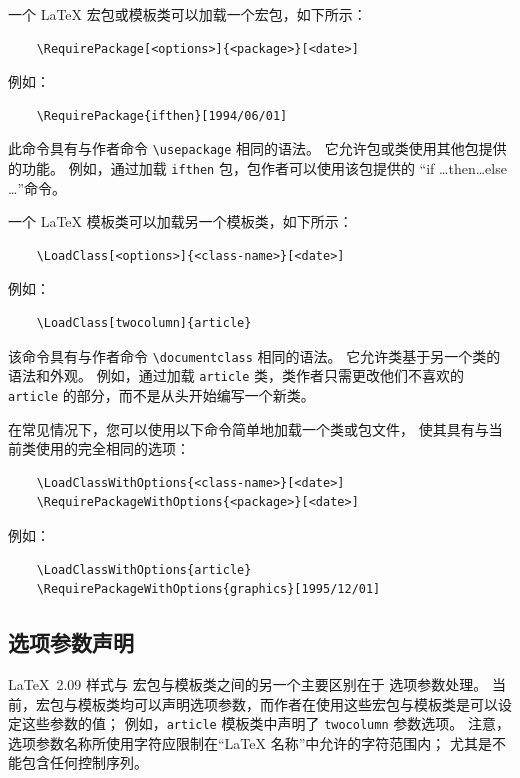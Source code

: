 \documentclass{ltxguide}[1995/11/28]
\begin{document}
一个 \LaTeX{} 宏包或模板类可以加载一个宏包，如下所示：
\begin{verbatim}
	\RequirePackage[<options>]{<package>}[<date>]
\end{verbatim}
例如：
\begin{verbatim}
	\RequirePackage{ifthen}[1994/06/01]
\end{verbatim}
此命令具有与作者命令 \verb|\usepackage| 相同的语法。
它允许包或类使用其他包提供的功能。
例如，通过加载 \verb|ifthen| 包，包作者可以使用该包提供的
“if \dots then\dots else \dots”命令。

一个 \LaTeX{} 模板类可以加载另一个模板类，如下所示：
\begin{verbatim}
	\LoadClass[<options>]{<class-name>}[<date>]
\end{verbatim}
例如：
\begin{verbatim}
	\LoadClass[twocolumn]{article}
\end{verbatim}
该命令具有与作者命令 \verb|\documentclass| 相同的语法。
它允许类基于另一个类的语法和外观。
例如，通过加载 \verb|article| 类，类作者只需更改他们不喜欢的
\verb|article| 的部分，而不是从头开始编写一个新类。

在常见情况下，您可以使用以下命令简单地加载一个类或包文件，
使其具有与当前类使用的完全相同的选项：
\begin{verbatim}
	\LoadClassWithOptions{<class-name>}[<date>]
	\RequirePackageWithOptions{<package>}[<date>]
\end{verbatim}
例如：
\begin{verbatim}
	\LoadClassWithOptions{article}
	\RequirePackageWithOptions{graphics}[1995/12/01]
\end{verbatim}

\subsection{选项参数声明}

\LaTeX~2.09 样式与 \LaTeXe{} 宏包与模板类之间的另一个主要区别在于
选项参数处理。
当前，宏包与模板类均可以声明选项参数，而作者在使用这些宏包与模板类是可以设定这些参数的值；
例如，\verb|article| 模板类中声明了 \verb|twocolumn| 参数选项。
注意，选项参数名称所使用字符应限制在“\LaTeX{} 名称”中允许的字符范围内；
尤其是不能包含任何控制序列。
\end{document}
